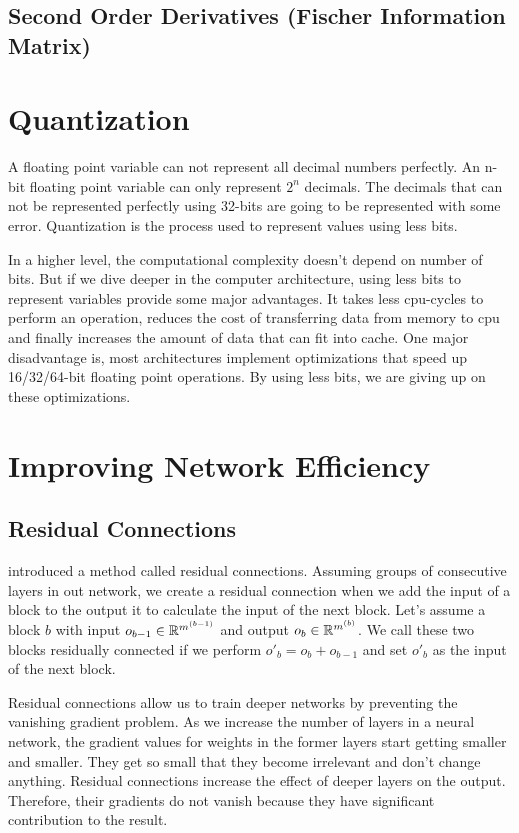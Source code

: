 \subsection{Second Order Derivatives (Fischer Information Matrix)}
\fi

\section{Quantization}
A floating point variable can not represent all decimal numbers perfectly. An n-bit floating point variable can only represent $2^{n}$ decimals. The decimals that can not be represented perfectly using 32-bits are going to be represented with some error. Quantization is the process used to represent values using less bits. 

In a higher level, the computational complexity doesn't depend on number of bits. But if we dive deeper in the computer architecture, using less bits to represent variables provide some major advantages. It takes less cpu-cycles to perform an operation, reduces the cost of transferring data from memory to cpu and finally increases the amount of data that can fit into cache. One major disadvantage is, most architectures implement optimizations that speed up 16/32/64-bit floating point operations. By using less bits, we are giving up on these optimizations. 

\section{Improving Network Efficiency}

\subsection{Residual Connections}
\cite{He:2015aa} introduced a method called residual connections. Assuming groups of consecutive layers in out network, we create a residual connection when we add the input of a block to the output it to calculate the input of the next block. Let's assume a block $b$ with input $o_{b-1} \in \mathbb{R}^{m^{(b-1)}}$ and output  $o_{b} \in \mathbb{R}^{m^{(b)}}$. We call these two blocks residually connected if we perform $o'_b = o_b + o_{b-1}$ and set $o'_b$ as the input of the next block. 

Residual connections allow us to train deeper networks by preventing the vanishing gradient problem. As we increase the number of layers in a neural network, the gradient values for weights in the former layers start getting smaller and smaller. They get so small that they become irrelevant and don't change anything. Residual connections increase the effect of deeper layers on the output. Therefore, their gradients do not vanish because they have significant contribution to the result.

